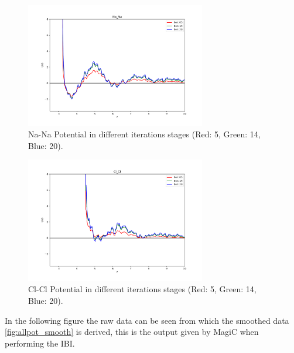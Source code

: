 \documentclass[10pt]{article}
\begin{document}
        \begin{figure}[H]
            \centering
            \includegraphics[width = 0.7\textwidth]{iters_conv_Na_Na.pdf}
            \caption{Na-Na Potential in different iterations stages (Red: 5, Green: 14, Blue: 20).}
            \label{fig:Na-Na-iter}
        \end{figure}

        \begin{figure}[H]
            \centering
            \includegraphics[width = 0.7\textwidth]{iters_conv_Cl_Cl.pdf}
            \caption{Cl-Cl Potential in different iterations stages (Red: 5, Green: 14, Blue: 20).}
            \label{fig:Cl-Cl-iter}
        \end{figure}

        In the following figure the raw data can be seen from which the smoothed data \ref{fig:allpot_smooth} is derived, this is the output given by MagiC when performing the IBI.
        
\end{document}
